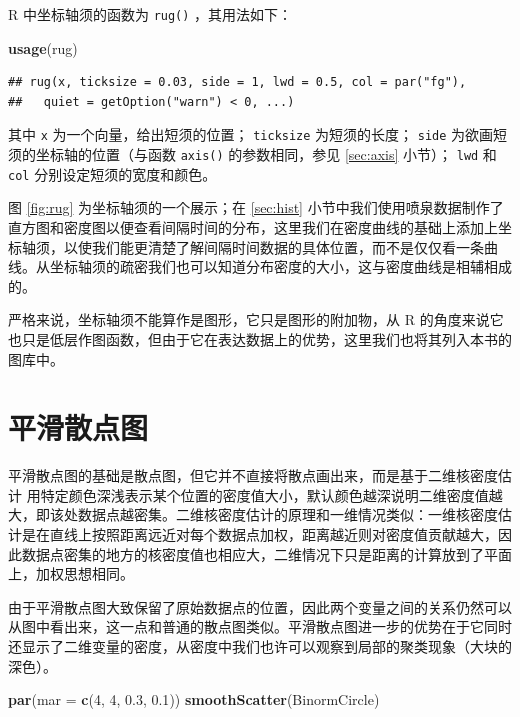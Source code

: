\documentclass[
  b5paper,
  UTF8,twoside]{book}
\newenvironment{Shaded}{\begin{snugshade}}{\end{snugshade}}
\newcommand{\AttributeTok}[1]{\textcolor[rgb]{0.13,0.29,0.53}{#1}}
\newcommand{\DecValTok}[1]{\textcolor[rgb]{0.00,0.00,0.81}{#1}}
\newcommand{\FloatTok}[1]{\textcolor[rgb]{0.00,0.00,0.81}{#1}}
\newcommand{\FunctionTok}[1]{\textcolor[rgb]{0.13,0.29,0.53}{\textbf{#1}}}
\newcommand{\NormalTok}[1]{#1}
\begin{document}
R 中坐标轴须的函数为 \texttt{rug()} ，其用法如下：

\begin{Shaded}
\begin{Highlighting}[]
\FunctionTok{usage}\NormalTok{(rug)}
\end{Highlighting}
\end{Shaded}

\begin{verbatim}
## rug(x, ticksize = 0.03, side = 1, lwd = 0.5, col = par("fg"),
##   quiet = getOption("warn") < 0, ...)
\end{verbatim}

其中 \texttt{x} 为一个向量，给出短须的位置； \texttt{ticksize} 为短须的长度； \texttt{side} 为欲画短须的坐标轴的位置（与函数 \texttt{axis()} 的参数相同，参见 \ref{sec:axis} 小节）； \texttt{lwd} 和 \texttt{col} 分别设定短须的宽度和颜色。

图 \ref{fig:rug} 为坐标轴须的一个展示；在 \ref{sec:hist} 小节中我们使用喷泉数据制作了直方图和密度图以便查看间隔时间的分布，这里我们在密度曲线的基础上添加上坐标轴须，以使我们能更清楚了解间隔时间数据的具体位置，而不是仅仅看一条曲线。从坐标轴须的疏密我们也可以知道分布密度的大小，这与密度曲线是相辅相成的。

严格来说，坐标轴须不能算作是图形，它只是图形的附加物，从 R 的角度来说它也只是低层作图函数，但由于它在表达数据上的优势，这里我们也将其列入本书的图库中。

\section{平滑散点图}\label{sec:smoothScatter}

平滑散点图的基础是散点图，但它并不直接将散点画出来，而是基于二维核密度估计 \citep{KernSmooth} 用特定颜色深浅表示某个位置的密度值大小，默认颜色越深说明二维密度值越大，即该处数据点越密集。二维核密度估计的原理和一维情况类似：一维核密度估计是在直线上按照距离远近对每个数据点加权，距离越近则对密度值贡献越大，因此数据点密集的地方的核密度值也相应大，二维情况下只是距离的计算放到了平面上，加权思想相同。

由于平滑散点图大致保留了原始数据点的位置，因此两个变量之间的关系仍然可以从图中看出来，这一点和普通的散点图类似。平滑散点图进一步的优势在于它同时还显示了二维变量的密度，从密度中我们也许可以观察到局部的聚类现象（大块的深色）。





\begin{Shaded}
\begin{Highlighting}[]
\FunctionTok{par}\NormalTok{(}\AttributeTok{mar =} \FunctionTok{c}\NormalTok{(}\DecValTok{4}\NormalTok{, }\DecValTok{4}\NormalTok{, }\FloatTok{0.3}\NormalTok{, }\FloatTok{0.1}\NormalTok{))}
\FunctionTok{smoothScatter}\NormalTok{(BinormCircle)}
\end{Highlighting}
\end{Shaded}
\end{document}
